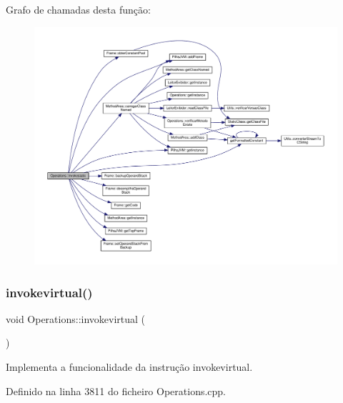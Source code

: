 Grafo de chamadas desta função\+:\nopagebreak
\begin{figure}[H]
\begin{center}
\leavevmode
\includegraphics[width=350pt]{classOperations_a562d8c9cc5975de2ee6d1a95e1969724_cgraph}
\end{center}
\end{figure}
\mbox{\label{classOperations_acf53d7e184b8828702b4d5036ef0a7a9}} 
\subsubsection{\texorpdfstring{invokevirtual()}{invokevirtual()}}
{\footnotesize\ttfamily void Operations\+::invokevirtual (\begin{DoxyParamCaption}{ }\end{DoxyParamCaption})\hspace{0.3cm}{\ttfamily [private]}}



Implementa a funcionalidade da instrução invokevirtual. 



Definido na linha 3811 do ficheiro Operations.\+cpp.



